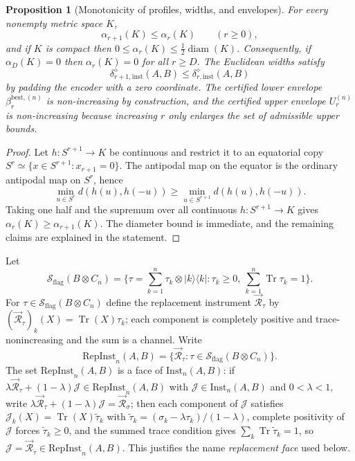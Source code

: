 \documentclass[11pt,a4paper]{article}
\newtheorem{proposition}[theorem]{Proposition}
\newcommand{\Sstate}{\mathcal{S}}
\newcommand{\Inst}{\mathrm{Inst}}
\newcommand{\RepInst}{\mathrm{RepInst}}
\newcommand{\Tr}{\operatorname{Tr}}
\newcommand{\diam}{\operatorname{diam}}
\begin{document}
\begin{proposition}[Monotonicity of profiles, widths, and envelopes]
\label{prop:monotonicity}
For every nonempty metric space $K$,
\[
\alpha_{r+1}(K)\le\alpha_r(K)\qquad(r\ge0),
\]
and if $K$ is compact then $0\le\alpha_r(K)\le\tfrac12\diam(K)$. Consequently, if $\alpha_D(K)=0$ then $\alpha_r(K)=0$ for all $r\ge D$. The Euclidean widths satisfy
\[
\delta_{r+1,\mathrm{inst}}^{\diamond}(A,B)\le\delta_{r,\mathrm{inst}}^{\diamond}(A,B)
\]
by padding the encoder with a zero coordinate. The certified lower envelope $\beta_r^{\mathrm{best},(n)}$ is non-increasing by construction, and the certified upper envelope $U_r^{(n)}$ is non-increasing because increasing $r$ only enlarges the set of admissible upper bounds.
\end{proposition}

\begin{proof}
Let $h:S^{r+1}\to K$ be continuous and restrict it to an equatorial copy $S^r\simeq\{x\in S^{r+1}:x_{r+1}=0\}$. The antipodal map on the equator is the ordinary antipodal map on $S^r$, hence
\[
\min_{u\in S^r}d(h(u),h(-u))
\ge\min_{u\in S^{r+1}}d(h(u),h(-u)).
\]
Taking one half and the supremum over all continuous $h:S^{r+1}\to K$ gives $\alpha_r(K)\ge\alpha_{r+1}(K)$. The diameter bound is immediate, and the remaining claims are explained in the statement.
\end{proof}

Let
\[
\Sstate_{\mathrm{flag}}(B\otimes C_n)
=\Big\{\tau=\sum_{k=1}^n\tau_k\otimes|k\rangle\langle k|:
\tau_k\ge0,\ \sum_{k=1}^n\Tr\tau_k=1\Big\}.
\]
For $\tau\in\Sstate_{\mathrm{flag}}(B\otimes C_n)$ define the replacement instrument $\vec{\mathcal R}_\tau$ by $(\vec{\mathcal R}_\tau)_k(X)=\Tr(X)\tau_k$; each component is completely positive and trace-nonincreasing and the sum is a channel. Write
\[
\RepInst_n(A,B)=\{\vec{\mathcal R}_\tau:\tau\in\Sstate_{\mathrm{flag}}(B\otimes C_n)\}.
\]
The set $\RepInst_n(A,B)$ is a face of $\Inst_n(A,B)$: if $\lambda\vec{\mathcal R}_\tau+(1-\lambda)\mathcal J\in\RepInst_n(A,B)$ with $\mathcal J\in\Inst_n(A,B)$ and $0<\lambda<1$, write $\lambda\vec{\mathcal R}_\tau+(1-\lambda)\mathcal J=\vec{\mathcal R}_\sigma$; then each component of $\mathcal J$ satisfies $\mathcal J_k(X)=\Tr(X)\tilde\tau_k$ with $\tilde\tau_k=(\sigma_k-\lambda\tau_k)/(1-\lambda)$, complete positivity of $\mathcal J$ forces $\tilde\tau_k\ge0$, and the summed trace condition gives $\sum_k\Tr\tilde\tau_k=1$, so $\mathcal J=\vec{\mathcal R}_{\tilde\tau}\in\RepInst_n(A,B)$. This justifies the name \emph{replacement face} used below.
\end{document}
